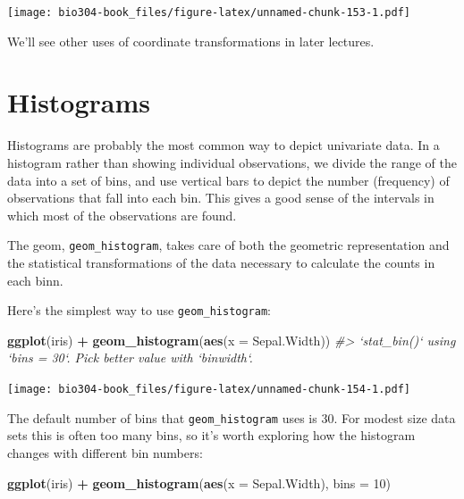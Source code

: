 \documentclass[]{book}
\newenvironment{Shaded}{\begin{snugshade}}{\end{snugshade}}
\newcommand{\CommentTok}[1]{\textcolor[rgb]{0.56,0.35,0.01}{\textit{#1}}}
\newcommand{\DataTypeTok}[1]{\textcolor[rgb]{0.13,0.29,0.53}{#1}}
\newcommand{\DecValTok}[1]{\textcolor[rgb]{0.00,0.00,0.81}{#1}}
\newcommand{\KeywordTok}[1]{\textcolor[rgb]{0.13,0.29,0.53}{\textbf{#1}}}
\newcommand{\NormalTok}[1]{#1}
\newcommand{\OperatorTok}[1]{\textcolor[rgb]{0.81,0.36,0.00}{\textbf{#1}}}
\newcommand{\StringTok}[1]{\textcolor[rgb]{0.31,0.60,0.02}{#1}}
\theoremstyle{definition}
\theoremstyle{definition}
\theoremstyle{definition}
\theoremstyle{remark}
\begin{document}
\texttt{[image: bio304-book\_files/figure-latex/unnamed-chunk-153-1.pdf]}

We'll see other uses of coordinate transformations in later lectures.

\hypertarget{histograms-1}{%
\section{Histograms}\label{histograms-1}}

Histograms are probably the most common way to depict univariate data.
In a histogram rather than showing individual observations, we divide
the range of the data into a set of bins, and use vertical bars to
depict the number (frequency) of observations that fall into each bin.
This gives a good sense of the intervals in which most of the
observations are found.

The geom, \texttt{geom\_histogram}, takes care of both the geometric
representation and the statistical transformations of the data necessary
to calculate the counts in each binn.

Here's the simplest way to use \texttt{geom\_histogram}:

\begin{Shaded}
\begin{Highlighting}[]
\KeywordTok{ggplot}\NormalTok{(iris) }\OperatorTok{+}\StringTok{ }
\StringTok{  }\KeywordTok{geom_histogram}\NormalTok{(}\KeywordTok{aes}\NormalTok{(}\DataTypeTok{x =}\NormalTok{ Sepal.Width))}
\CommentTok{#> `stat_bin()` using `bins = 30`. Pick better value with `binwidth`.}
\end{Highlighting}
\end{Shaded}

\texttt{[image: bio304-book\_files/figure-latex/unnamed-chunk-154-1.pdf]}

The default number of bins that \texttt{geom\_histogram} uses is 30. For
modest size data sets this is often too many bins, so it's worth
exploring how the histogram changes with different bin numbers:

\begin{Shaded}
\begin{Highlighting}[]
\KeywordTok{ggplot}\NormalTok{(iris) }\OperatorTok{+}\StringTok{ }
\StringTok{  }\KeywordTok{geom_histogram}\NormalTok{(}\KeywordTok{aes}\NormalTok{(}\DataTypeTok{x =}\NormalTok{ Sepal.Width), }\DataTypeTok{bins =} \DecValTok{10}\NormalTok{)}
\end{Highlighting}
\end{Shaded}
\end{document}
